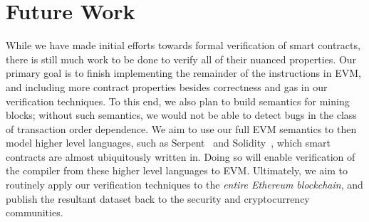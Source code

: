 \section{Future Work}
While we have made initial efforts towards formal verification of smart
contracts, there is still much work to be done to verify all of their nuanced
properties. Our primary goal is to finish implementing the remainder of the
instructions in EVM, and including more contract properties besides correctness
and gas in our verification techniques. To this end, we also plan to build
semantics for mining blocks; without such semantics, we would not be able to
detect bugs in the class of transaction order dependence. We aim to use our full EVM
semantics to then model higher level languages, such as Serpent~\cite{serpent}
and Solidity~\cite{solidity}, which smart contracts are almost ubiquitously
written in. Doing so will enable verification of the compiler from these higher
level languages to EVM. Ultimately, we aim to routinely apply our
verification techniques to the \textit{entire Ethereum blockchain}, and
publish the resultant dataset back to the security and cryptocurrency
communities.

